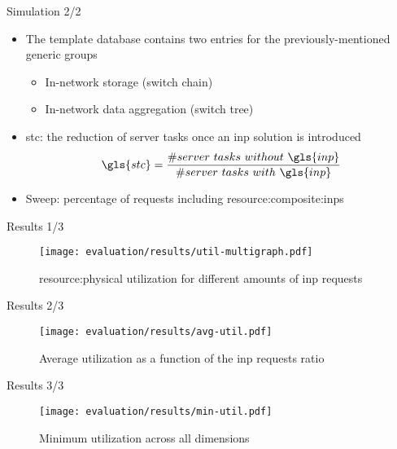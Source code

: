 \begin{frame}{Simulation 2/2}
    \begin{itemize}
        \item The template database contains two entries for the previously-mentioned generic groups
        \begin{itemize}
            \item In-network storage (switch chain)
            \item In-network data aggregation (switch tree)
        \end{itemize}
        \item \gls{stc}: the reduction of server tasks once an \gls{inp} solution is introduced
        \vspace{.2mm}
        \begin{equation}
        \label{stc_formula}
        \gls{stc}=\dfrac{\#server\ tasks\ without\ \gls{inp}}{\#server\ tasks\ with\ \gls{inp}}
        \end{equation}
        \vspace{.2mm}
        \item Sweep: percentage of requests including \glspl{resource:composite:inp}
    \end{itemize}
\end{frame}

\begin{frame}{Results 1/3}
    \begin{figure}
        \captionsetup{font=scriptsize}
        \texttt{[image: evaluation/results/util-multigraph.pdf]}
        \caption{\Gls{resource:physical} utilization for different amounts of \gls{inp} requests}
    \end{figure}
\end{frame}

\begin{frame}{Results 2/3}
    \vspace{4mm}
    \begin{figure}
        \captionsetup{font=footnotesize}
        \texttt{[image: evaluation/results/avg-util.pdf]}
        \vspace{2mm}
        \caption{Average  utilization as a function of the \gls{inp} requests ratio}
    \end{figure}
\end{frame}

\begin{frame}{Results 3/3}
    \vspace{2mm}
    \begin{figure}
        \captionsetup{font=footnotesize}
        \texttt{[image: evaluation/results/min-util.pdf]}
        \vspace{2mm}
        \caption{Minimum  utilization across all dimensions}
    \end{figure}
\end{frame}
